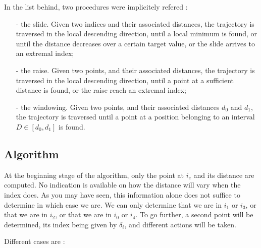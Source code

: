 In the list behind, two procedures were implicitely refered : 
\begin{itemize}

\item[-] the slide. Given two indices and their associated distances, the trajectory is traversed in the 
local descending direction, until a local minimum is found, or until the distance decreases 
over a certain target value, or the slide arrives to an extremal index;

\item[-] the raise. Given two points, and their associated distances, the trajectory is traversed in the
local descending direction, until a point at a sufficient distance is found, or the raise reach an extremal 
index;

\item[-] the windowing. Given two points, and their associated distances $d_0$ and $d_1$, 
the trajectory is traversed until a point at a position belonging to an interval 
$D \in [d_0, d_1]$ is found.

\end{itemize}


\subsection{Algorithm}

At the beginning stage of the algorithm, only the point at $i_e$ and its distance are computed.
No indication is available on how the distance will vary when the index does. 
As you may have seen, this information alone does not suffice to determine in which case 
we are.
We can only determine that we are in $i_1$ or $i_3$, or that we are in $i_2$, or that we are 
in $i_0$ or $i_4$.
To go further, a second point will be determined, its index being given by $\delta _i$, and different actions
will be taken.
\newline

Different cases are : 

